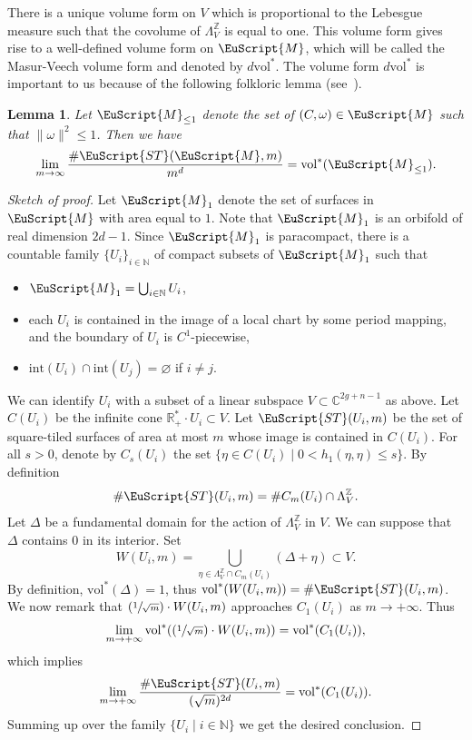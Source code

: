 \documentclass[JEP,XML,SOM,Unicode]{cedram}
\let\mathcal\EuScript
\newcommand{\Psfrac}[2]{(\sfrac{#1}{#2})}
\theoremstyle{plain}
\newtheorem{Lemma}[Theorem]{Lemma}
\theoremstyle{definition}
\newcommand{\R}{\mathbb{R}}
\def\C{\mathbb{C}}
\newcommand\Z{\mathbb{Z}}
\newcommand{\N}{\mathbb{N}}
\newcommand{\Mcal}{\mathcal{M}}
\newcommand{\cM}{\mathcal{M}}
\newcommand{\ST}{\mathcal{ST}}
\newcommand{\inter}{\mathrm{int}}
\newcommand{\vol}{\mathrm{vol}}
\begin{document}
There is a unique volume form on $V$ which is proportional to the Lebesgue measure such that the covolume of $\Lambda^\Z_V$ is equal to one.
This volume form gives rise to a well-defined volume form on $\Mcal$, which will be called the Masur-Veech volume form and denoted by $d\vol^*$.
The volume form $d\vol^*$ is important to us because of the following folkloric lemma (see~\cite[Prop.\,1.6]{EO01}).

\begin{Lemma}\label{lm:MV:vol:count}
Let $\Mcal_{\leq 1}$ denote the set of $(C,\omega)\in \Mcal$ such that $\|\omega\|^2\leq 1$. Then we have
\[
\lim_{m\to \infty}\frac{\#\ST(\Mcal,m)}{m^d}=\vol^*(\Mcal_{\leq 1}).
\]
\end{Lemma}
\begin{proof}[Sketch of proof]
Let $\cM_1$ denote the set of surfaces in $\cM$ with area equal to $1$. Note that $\cM_1$ is an orbifold of real dimension $2d-1$.
Since $\cM_1$ is paracompact, there is a countable family $\{U_i\}_{i\in \N}$ of compact subsets of $\cM_1$ such that
\begin{itemize}
\item
$\cM_1=\bigcup_{i\in \N}U_i$,

\item
each $U_i$ is contained in the image of a local chart by some period mapping, and the boundary of $U_i$ is $C^1$-piecewise,

\item
$\inter(U_i)\cap\inter(U_j)=\varnothing$ if $i\neq j$.
\end{itemize}
We can identify $U_i$ with a subset of a linear subspace $V\subset \C^{2g+n-1}$ as above.
Let $C(U_i)$ be the infinite cone $\R^*_+\cdot U_i \subset V$.
Let $\ST(U_i,m)$ be the set of square-tiled surfaces of area at most $m$ whose image is contained in $C(U_i)$.
For all $s >0$, denote by $C_s(U_i)$ the set $\{\eta \in C(U_i)\mid 0< h_1(\eta,\eta) \leq s\}$.
By definition
\[
\#\ST(U_i,m)=\#C_m(U_i)\cap\Lambda^\Z_V.
\]
Let $\Delta$ be a fundamental domain for the action of $\Lambda^\Z_V$ in $V$.
We can suppose that $\Delta$ contains $0$ in its interior.
Set
\[
W(U_i,m)=\bigcup_{\eta\in\Lambda^{\Z}_V\cap C_{m}(U_i)}(\Delta+\eta) \subset V.
\]
By definition, $\vol^*(\Delta)=1$, thus $\vol^*(W(U_i,m))=\#\ST(U_i,m)$.
We now remark that $\Psfrac{1}{\sqrt{m}}\cdot W(U_i,m)$ approaches $C_1(U_i)$ as $m \to +\infty$. Thus
\[
\lim_{m \to +\infty}\vol^*(\Psfrac{1}{\sqrt{m}}\cdot W(U_i,m))= \vol^*(C_{1}(U_i)),
\]
which implies
\[
\lim_{m\to +\infty}\frac{\#\ST(U_i,m)}{(\sqrt{m})^{2d}}=\vol^*(C_1(U_i)).
\]
Summing up over the family $\{U_i\mid i \in \N\}$ we get the desired conclusion.
\end{proof}
\end{document}
